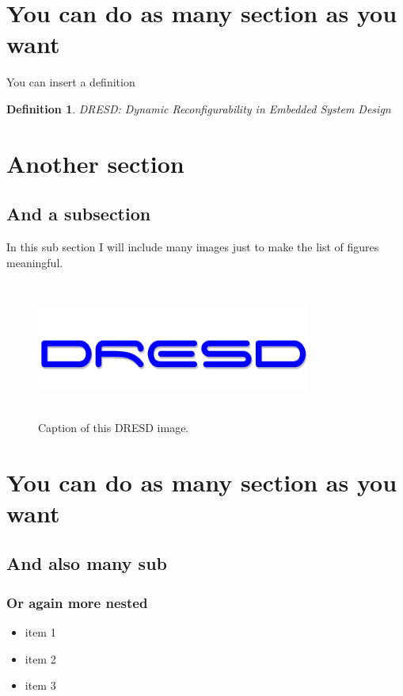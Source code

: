\documentclass[a4paper,12pt]{article}
\newtheorem{Definition}{Definition}[section]
\begin{document}
\section{You can do as many section as you want}
You can insert a definition
	\begin{Definition}
		DRESD: Dynamic Reconfigurability in Embedded System Design
	\end{Definition}
	
\newpage

\section{Another section}
	\subsection{And a subsection}
		In this sub section I will include many images just to make the list of figures meaningful.

			\begin{figure}[h!tb]
				\centerline {\includegraphics[width=9cm,height=4.5cm]{img/scritta.png}}
				\caption{Caption of this DRESD image.}
				\label{fig:leet}
			\end{figure}

\newpage

\section{You can do as many section as you want}
	\subsection{And also many sub}
		\subsubsection{Or again more nested}
			\begin{itemize}
				\item item 1
				\item item 2
				\item item 3
			\end{itemize}			
\end{document}
